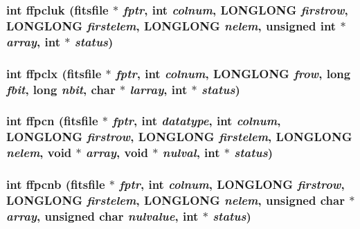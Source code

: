 \subsubsection{\setlength{\rightskip}{0pt plus 5cm}int ffpcluk (\bf{fitsfile} $\ast$ {\em fptr}, int {\em colnum}, \bf{LONGLONG} {\em firstrow}, \bf{LONGLONG} {\em firstelem}, \bf{LONGLONG} {\em nelem}, unsigned int $\ast$ {\em array}, int $\ast$ {\em status})}\label{test_2roimasker_2fitsio_8h_b4d5611f33c75c133789ec5742f76240}


\subsubsection{\setlength{\rightskip}{0pt plus 5cm}int ffpclx (\bf{fitsfile} $\ast$ {\em fptr}, int {\em colnum}, \bf{LONGLONG} {\em frow}, long {\em fbit}, long {\em nbit}, char $\ast$ {\em larray}, int $\ast$ {\em status})}\label{test_2roimasker_2fitsio_8h_36824bfe44a4dbdee167ea243384cab2}


\subsubsection{\setlength{\rightskip}{0pt plus 5cm}int ffpcn (\bf{fitsfile} $\ast$ {\em fptr}, int {\em datatype}, int {\em colnum}, \bf{LONGLONG} {\em firstrow}, \bf{LONGLONG} {\em firstelem}, \bf{LONGLONG} {\em nelem}, void $\ast$ {\em array}, void $\ast$ {\em nulval}, int $\ast$ {\em status})}\label{test_2roimasker_2fitsio_8h_a062602b8a804f46be72152477dc2321}


\subsubsection{\setlength{\rightskip}{0pt plus 5cm}int ffpcnb (\bf{fitsfile} $\ast$ {\em fptr}, int {\em colnum}, \bf{LONGLONG} {\em firstrow}, \bf{LONGLONG} {\em firstelem}, \bf{LONGLONG} {\em nelem}, unsigned char $\ast$ {\em array}, unsigned char {\em nulvalue}, int $\ast$ {\em status})}\label{test_2roimasker_2fitsio_8h_52e1f7ec25307939c85af2e5ab92fe5f}


